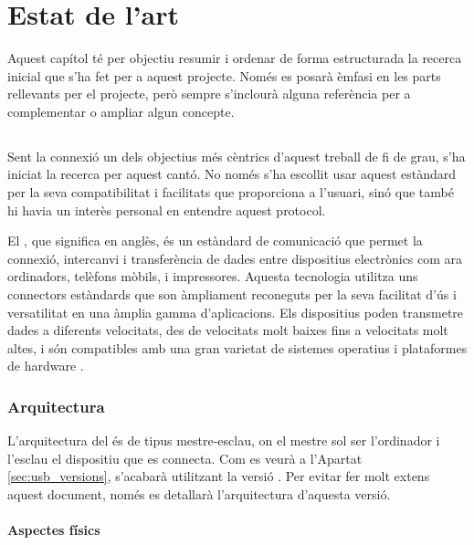 \chapter{Estat de l'art}
\label{cap:estat-de-l-art}

Aquest capítol té per objectiu resumir i ordenar de forma estructurada la
recerca inicial que s'ha fet per a aquest projecte. Només es posarà èmfasi en
les parts rellevants per el projecte, però sempre s'inclourà alguna referència
per a complementar o ampliar algun concepte.

\section{}

Sent la connexió  un dels objectius més cèntrics d'aquest treball de
fi de grau, s'ha iniciat la recerca per aquest cantó. No només s'ha escollit
usar aquest estàndard per la seva compatibilitat
i facilitats que proporciona a l'usuari, sinó que també hi havia un interès
personal en entendre aquest protocol.

El , que significa  en anglès, és un
estàndard de comunicació que permet la connexió, intercanvi i transferència de
dades entre dispositius electrònics com ara ordinadors, telèfons mòbils, i
impressores. Aquesta tecnologia utilitza uns connectors estàndards que son
àmpliament reconeguts per la seva facilitat d'ús i versatilitat en una àmplia
gamma d'aplicacions. Els dispositius  poden transmetre dades a
diferents velocitats, des de velocitats molt baixes fins a velocitats molt
altes, i són compatibles amb una gran varietat de sistemes operatius i
plataformes de hardware \cite{Axelson2015USB}.

\subsection{Arquitectura}

L'arquitectura del  és de tipus mestre-esclau, on el mestre sol ser
l'ordinador i l'esclau el dispositiu que es connecta. Com es veurà a l'Apartat
\ref{sec:usb_versions}, s'acabarà utilitzant la versió . Per
evitar fer molt extens aquest document, només es detallarà l'arquitectura
d'aquesta versió.

\subsubsection*{Aspectes físics}
\label{subsub:usb_physic}

